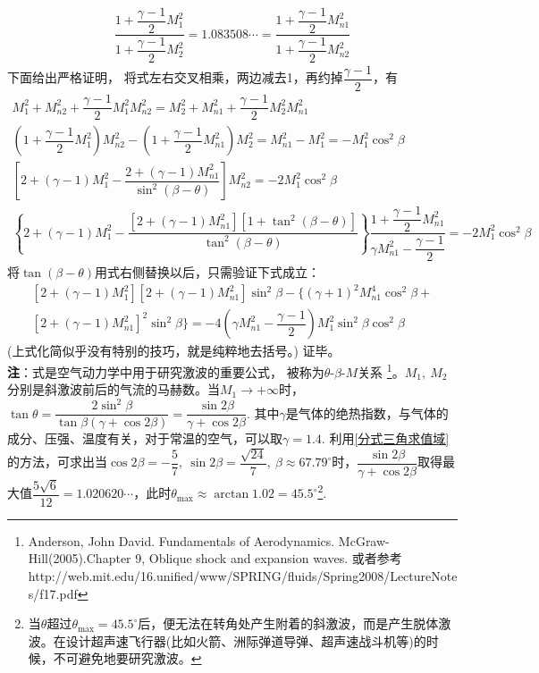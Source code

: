 \begin{enumerate}[label={【\textbf{例\thechapter.\arabic*}】},
 leftmargin=\inteval{\myenumleftmargin}pt,
 itemsep=\inteval{\myenumitempsep}pt,
 itemindent=\inteval{\myenumitemindent}pt]
\begin{align*}
    \dfrac{1+\dfrac{\gamma-1}{2}M_1^2}{1+\dfrac{\gamma-1}{2}M_2^2}
    =1.083508\cdots=
    \dfrac{1+\dfrac{\gamma-1}{2}M_{n1}^2}{1+\dfrac{\gamma-1}{2}M_{n2}^2}
\end{align*}
下面给出严格证明，
将式左右交叉相乘，两边减去1，再约掉$ \dfrac{\gamma-1}{2} $，有
\begin{gather*}
    M_1^2+M_{n2}^2+\dfrac{\gamma-1}{2}M_1^2M_{n2}^2=
    M_2^2+M_{n1}^2+\dfrac{\gamma-1}{2}M_2^2M_{n1}^2   \\
    \left(1+\dfrac{\gamma-1}{2}M_1^2\right)M_{n2}^2-
    \left(1+\dfrac{\gamma-1}{2}M_{n1}^2\right)M_{2}^2=M_{n1}^2-M_1^2
    =-M_1^2\cos^2\beta \\
    \left[2+(\gamma-1)M_1^2-\dfrac{2+(\gamma-1) M_{n1}^2}{\sin^2(\beta-\theta)}
    \right]M_{n2}^2=-2M_1^2\cos^2\beta \\
    \left\{2+(\gamma-1)M_1^2-\dfrac{[2+(\gamma-1) M_{n1}^2][1+
        \tan^2(\beta-\theta)]}{\tan^2(\beta-\theta)}
    \right\}\dfrac{1+\dfrac{\gamma-1}{2}M_{n1}^2}{\gamma M_{n1}^2
        -\dfrac{\gamma-1}{2}}=-2M_1^2\cos^2\beta
\end{gather*}
将$ \tan(\beta-\theta) $用式右侧替换以后，只需验证下式成立：
\begin{gather*}
    \left[2+(\gamma-1)M_1^2\right]\left[2+(\gamma-1)M_{n1}^2\right]\sin^2\beta-
    \Big\{(\gamma+1)^2M_{n1}^4\cos^2\beta+\\ [2+(\gamma-1) M_{n1}^2]^2
    \sin^2\beta \Big\}=-4\left(\gamma M_{n1}^2-\dfrac{\gamma-1}{2}\right)
    M_1^2\sin^2\beta\cos^2\beta
\end{gather*}
(上式化简似乎没有特别的技巧，就是纯粹地去括号。) 证毕。 \\
\textbf{注}：式是空气动力学中用于研究激波的重要公式，
被称为$ \theta$-$\beta$-$M$关系
\footnote{ Anderson, John David. Fundamentals of Aerodynamics. McGraw-Hill(2005).Chapter 9, Oblique shock and expansion waves. \quad  或者参考 http://web.mit.edu/16.unified/www/SPRING/fluids/Spring2008/LectureNotes/f17.pdf}。$ M_1,\ M_2 $分别是斜激波前后的气流的马赫数。当$ M_1\to +\infty $时，$ \tan\theta=\dfrac{2\sin^2\beta}{\tan\beta(\gamma+\cos2\beta)}=\dfrac{\sin2\beta}{\gamma+\cos2\beta} $. 其中$ \gamma $是气体的绝热指数，与气体的成分、压强、温度有关，对于常温的空气，可以取$ \gamma=1.4 $. 利用\ref{分式三角求值域}的方法，可求出当$ \cos2\beta=-\dfrac{5}{7},\ \sin2\beta=\dfrac{\sqrt{24}}{7},\ \beta\approx 67.79^{\circ} $时，$ \dfrac{\sin2\beta}{\gamma+\cos2\beta} $取得最大值$ \dfrac{5\sqrt{6}}{12}=1.020620\cdots $，此时$ \theta_{\max}\approx\arctan1.02=45.5^{\circ} $\footnote{当$ \theta $超过$ \theta_{\max}=45.5^{\circ} $后，便无法在转角处产生附着的斜激波，而是产生脱体激波。在设计超声速飞行器(比如火箭、洲际弹道导弹、超声速战斗机等)的时候，不可避免地要研究激波。}. \\

\end{enumerate}


